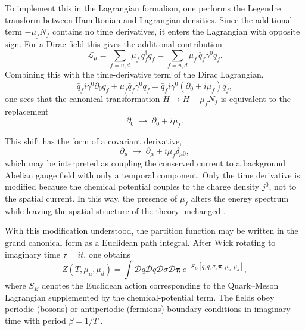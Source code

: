 To implement this in the Lagrangian formalism, one performs the
Legendre transform between Hamiltonian and Lagrangian densities.
Since the additional term $-\mu_f N_f$ contains no time derivatives,
it enters the Lagrangian with opposite sign. For a Dirac field this
gives the additional contribution
\begin{equation}
\mathcal{L}_{\mu}
= \sum_{f=u,d} \mu_f\, q_f^\dagger q_f
= \sum_{f=u,d} \mu_f\, \bar q_f \gamma^0 q_f .
\label{eq:L_mu_final}
\end{equation}
Combining this with the time-derivative term of the Dirac Lagrangian,
\begin{equation}
\bar q_f i\gamma^0 \partial_0 q_f
+ \mu_f \bar q_f \gamma^0 q_f
=
\bar q_f i\gamma^0 (\partial_0 + i\mu_f) q_f ,
\end{equation}
one sees that the canonical transformation
$H \to H - \mu_f N_f$ is equivalent to the replacement
\begin{equation}
\partial_0 \;\longrightarrow\; \partial_0 + i\mu_f .
\label{eq:partial_shift}
\end{equation}

This shift has the form of a covariant derivative,
\begin{equation}
\partial_\mu \;\longrightarrow\;
\partial_\mu + i\mu_f \delta_{\mu 0},
\end{equation}
which may be interpreted as coupling the conserved current to a
background Abelian gauge field with only a temporal component.
Only the time derivative is modified because the chemical potential
couples to the charge density $j^0$, not to the spatial current.
In this way, the presence of $\mu_f$ alters the energy spectrum while
leaving the spatial structure of the theory unchanged
\cite{KapustaGale,LaineVuorinen}.

With this modification understood, the partition function may be
written in the grand canonical form as a Euclidean path integral.
After Wick rotating to imaginary time $\tau = i t$, one obtains
\begin{equation}
Z(T,\mu_u,\mu_d)
=
\int \mathcal{D}\bar q \mathcal{D}q
\mathcal{D}\sigma \mathcal{D}\boldsymbol{\pi}
\, e^{-S_E[\bar q,q,\sigma,\boldsymbol{\pi};\mu_u,\mu_d]} ,
\end{equation}
where $S_E$ denotes the Euclidean action corresponding to the
Quark--Meson Lagrangian supplemented by the chemical-potential term.
The fields obey periodic (bosons) or antiperiodic (fermions)
boundary conditions in imaginary time with period $\beta=1/T$
\cite{KapustaGale}.


